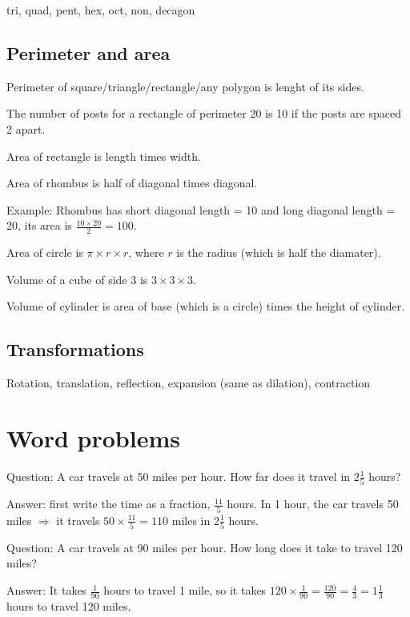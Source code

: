 \documentclass[fullpage,twocolumn]{article}
\newcommand{\vp}{{\vspace{0.1in}}}
\begin{document}
tri, quad, pent, hex, oct, non, decagon

\subsection{Perimeter and area}

Perimeter of square/triangle/rectangle/any polygon is lenght of its sides.

The number of posts for a rectangle of perimeter
20 is 10 if the posts are spaced 2 apart.

Area of rectangle is length times width.

Area of rhombus is half of diagonal times diagonal.

Example: Rhombus has short diagonal length = 10 and long diagonal length = 20,
its area is $\frac{10 \times 20}{2} = 100$.

Area of circle is $\pi \times r \times r$, where $r$ is the radius (which is half the diamater).

Volume of a cube of side 3 is $3 \times 3 \times 3$.

Volume of cylinder is area of base (which is a circle) times the
height of cylinder.

\subsection{Transformations}

Rotation, translation, reflection, expansion (same as dilation), contraction


\section{Word problems}

Question: A car travels at 50 miles per hour. How far does it
travel in $2\frac{1}{5}$ hours?

\vp
Answer: first write the time as a fraction, $\frac{11}{5}$ hours.
In 1 hour, the car travels 50 miles $\Rightarrow$ it travels $50 \times \frac{11}{5} = 110$ miles in
$2\frac{1}{5}$ hours.

Question: A car travels at 90 miles per hour. How long does it take to travel 120 miles?

\vp
Answer: It takes $\frac{1}{90}$ hours to travel 1 mile, so it takes $120\times \frac{1}{90} = \frac{120}{90} = \frac{4}{3} = 1 \frac{1}{3}$ hours to travel 120 miles.
\end{document}
